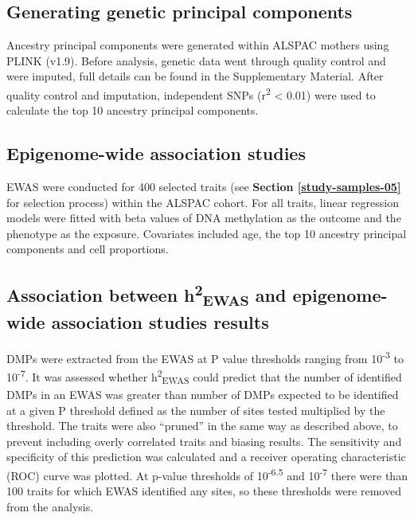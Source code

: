 \documentclass[11pt,oneside]{bristolthesis}
\begin{document}
\hypertarget{generating-genetic-principal-components}{%
\subsection{Generating genetic principal components}\label{generating-genetic-principal-components}}

Ancestry principal components were generated within ALSPAC mothers using PLINK (v1.9). Before analysis, genetic data went through quality control and were imputed, full details can be found in the Supplementary Material. After quality control and imputation, independent SNPs (r\textsuperscript{2} \textless{} 0.01) were used to calculate the top 10 ancestry principal components.

\hypertarget{methods-ewas-05}{%
\subsection{Epigenome-wide association studies}\label{methods-ewas-05}}

EWAS were conducted for 400 selected traits (see \textbf{Section \ref{study-samples-05}} for selection process) within the ALSPAC cohort. For all traits, linear regression models were fitted with beta values of DNA methylation as the outcome and the phenotype as the exposure. Covariates included age, the top 10 ancestry principal components and cell proportions.

\hypertarget{methods-h2ewas-dmp}{%
\subsection{\texorpdfstring{Association between h\textsuperscript{2}\textsubscript{EWAS} and epigenome-wide association studies results}{Association between h2EWAS and epigenome-wide association studies results}}\label{methods-h2ewas-dmp}}

DMPs were extracted from the EWAS at P value thresholds ranging from 10\textsuperscript{-3} to 10\textsuperscript{-7}. It was assessed whether h\textsuperscript{2}\textsubscript{EWAS} could predict that the number of identified DMPs in an EWAS was greater than number of DMPs expected to be identified at a given P threshold defined as the number of sites tested multiplied by the threshold. The traits were also ``pruned'' in the same way as described above, to prevent including overly correlated traits and biasing results. The sensitivity and specificity of this prediction was calculated and a receiver operating characteristic (ROC) curve was plotted. At p-value thresholds of 10\textsuperscript{-6.5} and 10\textsuperscript{-7} there were than 100 traits for which EWAS identified any sites, so these thresholds were removed from the analysis.
\end{document}
